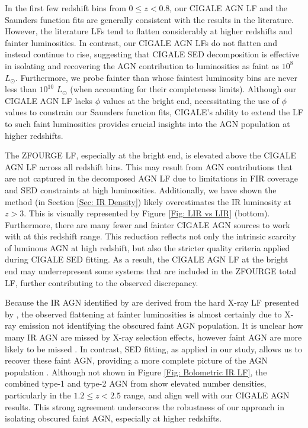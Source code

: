 In the first few redshift bins from $0 \leq z < 0.8$, our CIGALE AGN LF and the Saunders function fits are generally consistent with the results in the literature. However, the literature LFs tend to flatten considerably at higher redshifts and fainter luminosities. In contrast, our CIGALE AGN LFs do not flatten and instead continue to rise, suggesting that CIGALE SED decomposition is effective in isolating and recovering the AGN contribution to luminosities as faint as $10^8$ $L_{\odot}$. Furthermore, we probe fainter than \cite{thorne_deep_2022} whose faintest luminosity bins are never less than $10^{10}$ $L_{\odot}$ (when accounting for their completeness limits). Although our CIGALE AGN LF lacks $\phi$ values at the bright end, necessitating the use of \cite{thorne_deep_2022} $\phi$ values to constrain our Saunders function fits, CIGALE's ability to extend the LF to such faint luminosities provides crucial insights into the AGN population at higher redshifts. 

The ZFOURGE LF, especially at the bright end, is elevated above the CIGALE AGN LF across all redshift bins. This may result from AGN contributions that are not captured in the decomposed AGN LF due to limitations in FIR coverage and SED constraints at high luminosities. Additionally, we have shown the \cite{wuyts_fireworks_2008} method (in Section \ref{Sec: IR Density}) likely overestimates the IR luminosity at $z>3$. This is visually represented by Figure \ref{Fig: LIR vs LIR} (bottom). Furthermore, there are many fewer and fainter CIGALE AGN sources to work with at this redshift range. This reduction reflects not only the intrinsic scarcity of luminous AGN at high redshift, but also the stricter quality criteria applied during CIGALE SED fitting. As a result, the CIGALE AGN LF at the bright end may underrepresent some systems that are included in the ZFOURGE total LF, further contributing to the observed discrepancy.

Because the IR AGN identified by \cite{symeonidis_agn_2021} are derived from the hard X-ray LF presented by \cite{aird_evolution_2015}, the observed flattening at fainter luminosities is almost certainly due to X-ray emission not identifying the obscured faint AGN population. It is unclear how many IR AGN are missed by X-ray selection effects, however faint AGN are more likely to be missed \citep{frias_castillo_at_2024}. In contrast, SED fitting, as applied in our study, allows us to recover these faint AGN, providing a more complete picture of the AGN population \citep{gruppioni_modelling_2011, brown_infrared_2019, thorne_deep_2022}. Although not shown in Figure \ref{Fig: Bolometric IR LF}, the combined type-1 and type-2 AGN from \cite{symeonidis_agn_2021} show elevated number densities, particularly in the $1.2 \leq z < 2.5$ range, and align well with our CIGALE AGN results. This strong agreement underscores the robustness of our approach in isolating obscured faint AGN, especially at higher redshifts.

